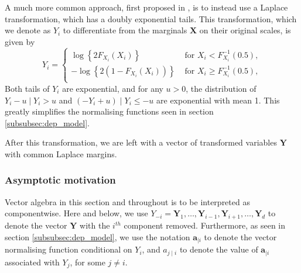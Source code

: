 \documentclass{article}
\numberwithin{equation}{section}
\begin{document}
A much more common approach, first proposed in \citet{Keef2013}, is to instead use a Laplace transformation, which has a doubly exponential tails.
This transformation, which we denote as $Y_i$ to differentiate from the marginals $\bm{X}$ on their original scales, is given by 
\begin{equation} \label{eq:laplace}
  Y_i = \begin{cases}
    \log\left\{2F_{X_i}(X_i)\right\} &\text{ for } X_i < F_{X_i}^{-1}(0.5), \\
    -\log\left\{2(1 - F_{X_i}(X_i))\right\} &\text{ for } X_i \ge F_{X_i}^{-1}(0.5), \\
  \end{cases}
\end{equation}
Both tails of $Y_i$ are exponential, and for any $u > 0$, the distribution of $Y_i - u \mid Y_i > u$ and $(-Y_i + u) \mid Y_i \le -u$ are exponential with mean 1. 
This greatly simplifies the normalising functions seen in section \ref{subsubsec:dep_model}.

After this transformation, we are left with a vector of transformed variables $\bm{Y}$ with common Laplace margins. 

\subsubsection{Asymptotic motivation}

Vector algebra in this section and throughout is to be interpreted as componentwise.
Here and below, we use $Y_{-i} = {\bm{Y}_1, \ldots, \bm{Y}_{i-1}, \bm{Y}_{i+1}, \ldots, \bm{Y}_d}$ to denote the vector $\bm{Y}$ with the $i^{th}$ component removed. %
Furthermore, as seen in section \ref{subsubsec:dep_model}, we use the notation $\bm{a}_{\mid i}$ to denote the vector normalising function conditional on $Y_i$, and $a_{j \mid i}$ to denote the value of $\bm{a}_{\mid i}$ associated with $Y_j$, for some $j \ne i$. 
\end{document}
